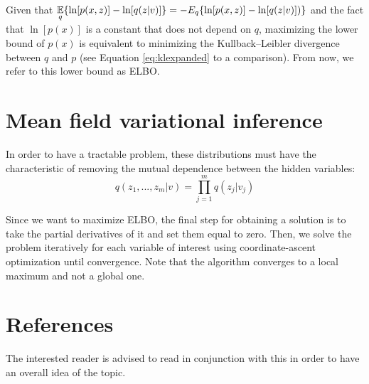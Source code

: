 Given that $ \displaystyle \operatorname*{\mathbb{E}}_q \{\ln[p(x,z)] - \ln[q(z | v)]\} = - E_q \{ \ln[p(x,z)] -\ln[q(z | v)]) \}$
and the fact that $\ln[p(x)]$ is a constant that does not depend on $q$,
maximizing the lower bound of $p(x)$ is equivalent to minimizing the Kullback–Leibler divergence between $q$ and $p$ (see Equation \ref{eq:klexpanded} to a comparison).
From now, we refer to this lower bound as ELBO.

\section{Mean field variational inference}
In order to have a tractable problem, these distributions must have the characteristic
of removing the mutual dependence between the hidden variables:
\[ q(z_1, ..., z_m| v) = \prod_{j=1}^m q(z_j | v_j) \]

Since we want to maximize ELBO,
the final step for obtaining a solution is to take the partial derivatives of it and set them equal to zero.
Then, we solve the problem iteratively for each variable of interest using coordinate-ascent optimization until convergence.
Note that the algorithm converges to a local maximum and not a global one.

\section{References}
The interested reader is advised to read \cite{Blei_2017} in conjunction with this in order to have an overall idea of the topic.